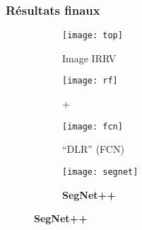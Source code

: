 \subsubsection{Résultats finaux}

\begin{figure}[ht]
  \begin{subfigure}[t]{0.25\textwidth}
    \texttt{[image: top]}
    \caption{Image \gls{IRRV}}
  \end{subfigure}%
  \begin{subfigure}[t]{0.25\textwidth}
    \texttt{[image: rf]}
    \caption{ + ~\cite{quang_efficient_2015}}
  \end{subfigure}%
  \begin{subfigure}[t]{0.25\textwidth}
    \texttt{[image: fcn]}
    \caption{``DLR'' (\gls{FCN})~\cite{marmanis_semantic_2016}}
  \end{subfigure}%
    \begin{subfigure}[t]{0.25\textwidth}
    \texttt{[image: segnet]}
    \caption{\textbf{SegNet++}}
  \end{subfigure}
  \label{fig_segnet_qualitative}
\end{figure}

